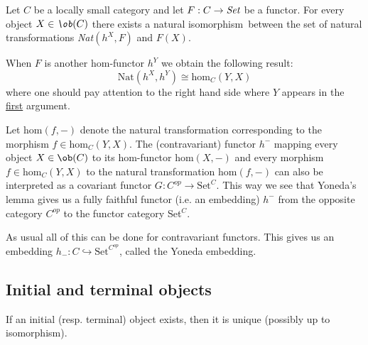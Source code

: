 	\begin{theorem}
		Let $C$ be a locally small category and let $F:C\rightarrow\emph{Set}$ be a functor. For every object $X\in\emph\ob(C)$ there exists a natural isomorphism\footnotemark\ between the set of natural transformations \emph{Nat}$(h^X, F)$ and $F(X)$.
	\end{theorem}
	\begin{result}
		When $F$ is another hom-functor $h^Y$ we obtain the following result:
		\begin{equation}
			\text{Nat}(h^X, h^Y)\cong\text{hom}_C(Y, X)
		\end{equation}
		where one should pay attention to the right hand side where $Y$ appears in the \underline{first} argument.
		
		Let $\text{hom}(f, -)$ denote the natural transformation corresponding to the morphism $f\in\text{hom}_C(Y,X)$. The (contravariant) functor $h^-$ mapping every object $X\in\ob(C)$ to its hom-functor hom$(X, -)$ and every morphism $f\in\text{hom}_C(Y, X)$ to the natural transformation hom$(f, -)$ can also be interpreted as a covariant functor $G:C^{op}\rightarrow\text{Set}^C$. This way we see that Yoneda's lemma gives us a fully faithful functor (i.e. an embedding) $h^-$ from the opposite category $C^{op}$ to the functor category Set$^C$.
		
		As usual all of this can be done for contravariant functors. This gives us an embedding $h_-:C\hookrightarrow\text{Set}^{C^{op}}$, called the Yoneda embedding. 
	\end{result}

\subsection{Initial and terminal objects}

	\begin{property}
		If an initial (resp. terminal) object exists, then it is unique (possibly up to isomorphism).
	\end{property}

